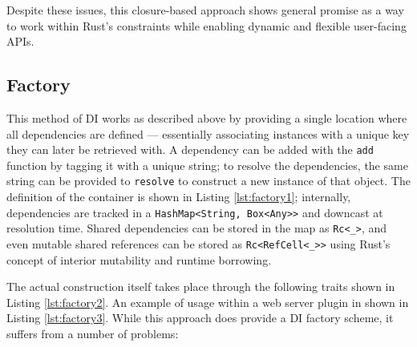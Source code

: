 \documentclass[sigconf]{acmart}
\begin{document}
Despite these issues, this closure-based approach shows general promise as a way to work within Rust's constraints while enabling dynamic and flexible user-facing APIs.

\subsection{Factory} \label{factory}

This method of DI works as described above by providing a single location where all dependencies are defined --- essentially associating instances with a unique key they can later be retrieved with. A dependency can be added with the \lstinline{add} function by tagging it with a unique string; to resolve the dependencies, the same string can be provided to \lstinline{resolve} to construct a new instance of that object. The definition of the container is shown in Listing \ref{lst:factory1}; internally, dependencies are tracked in a \lstinline{HashMap<String, Box<Any>>} and downcast at resolution time. Shared dependencies can be stored in the map as \lstinline{Rc<_>}, and even mutable shared references can be stored as \lstinline{Rc<RefCell<_>>} using Rust's concept of interior mutability and runtime borrowing.

\begin{minipage}{\linewidth}

\end{minipage}

The actual construction itself takes place through the following traits shown in Listing \ref{lst:factory2}. An example of usage within a web server plugin in shown in Listing \ref{lst:factory3}. While this approach does provide a DI factory scheme, it suffers from a number of problems:
\end{document}
